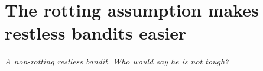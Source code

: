 \chapter{The rotting assumption makes restless bandits easier}
\label{ch:restless}
\vspace{-2.8cm}
\begin{flushright}
\emph{A non-rotting restless bandit. Who would say he is not tough?}
\end{flushright}
\vspace{.85cm}



